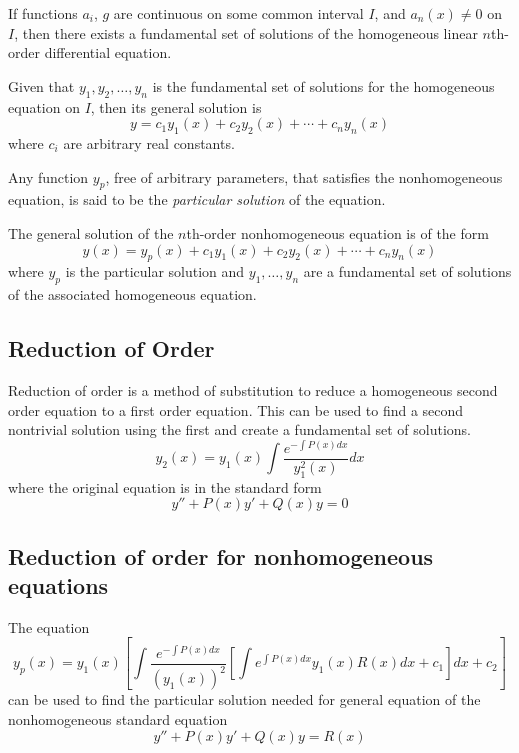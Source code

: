 \begin{theorem}
    If functions $a_i$, $g$ are continuous on some common interval $I$, and $a_n(x) \ne 0$ on $I$, then there exists a fundamental set of solutions of the homogeneous linear $n$th-order differential equation.
\end{theorem}

Given that $y_1, y_2, \ldots, y_n$ is the fundamental set of solutions for the homogeneous equation on $I$, then its general solution is
\[
    y = c_1 y_1(x) + c_2 y_2(x) + \cdots + c_n y_n(x)
\]
where $c_i$ are arbitrary real constants.

Any function $y_p$, free of arbitrary parameters, that satisfies the nonhomogeneous equation, is said to be the \textit{particular solution} of the equation.

\begin{theorem}
    The general solution of the $n$th-order nonhomogeneous equation is of the form
    \[
        y(x) = y_p(x) + c_1 y_1(x) + c_2 y_2(x) + \cdots + c_n y_n(x)
    \]
    where $y_p$ is the particular solution and $y_1, \ldots, y_n$ are a fundamental set of solutions of the associated homogeneous equation.
\end{theorem}

\subsection{Reduction of Order}

Reduction of order is a method of substitution to reduce a homogeneous second order equation to a first order equation. This can be used to find a second nontrivial solution using the first and create a fundamental set of solutions.
\[
    y_2(x) = y_1(x) \int \frac{e^{-\int P(x)dx}}{y_1^2(x)}dx
\]
where the original equation is in the standard form
\[
    y'' + P(x)y' + Q(x)y = 0
\]

\subsection{Reduction of order for nonhomogeneous equations}

The equation
\[
    y_p(x) = y_1(x) \left[ \int \frac{e^{-\int P(x)dx}}{(y_1(x))^2} \left[ \int e^{\int P(x)dx} y_1(x) R(x)dx + c_1 \right] dx + c_2 \right]
\]
can be used to find the particular solution needed for general equation of the nonhomogeneous standard equation
\[
    y'' + P(x)y' + Q(x)y = R(x)
\]